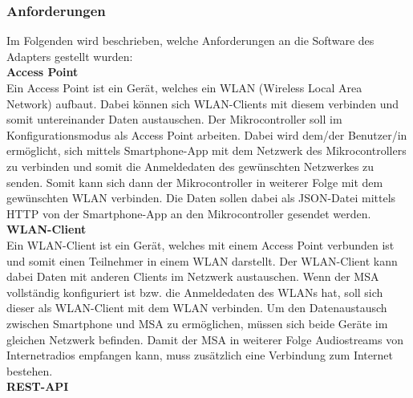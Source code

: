 \documentclass[11pt, twoside]{article}
\begin{document}
\subsubsection{Anforderungen}
Im Folgenden wird beschrieben, welche Anforderungen an die Software des Adapters gestellt wurden: \newline \\
\textbf{Access Point} \\
Ein Access Point ist ein Gerät, welches ein WLAN (Wireless Local Area Network) aufbaut. Dabei können sich WLAN-Clients mit diesem verbinden und somit untereinander Daten austauschen. \parencite[vgl.][]{noauthor_urlpi10_nodate-1}
Der Mikrocontroller soll im Konfigurationsmodus als Access Point arbeiten. Dabei wird dem/der Benutzer/in ermöglicht, sich mittels Smartphone-App mit dem Netzwerk des Mikrocontrollers zu verbinden und somit die Anmeldedaten des gewünschten Netzwerkes zu senden. Somit kann sich dann der Mikrocontroller in weiterer Folge mit dem gewünschten WLAN verbinden. Die Daten sollen dabei als JSON-Datei mittels HTTP von der Smartphone-App an den Mikrocontroller gesendet werden. \newline \\
\textbf{WLAN-Client} \\
Ein WLAN-Client ist ein Gerät, welches mit einem Access Point verbunden ist und somit einen Teilnehmer in einem WLAN darstellt. Der WLAN-Client kann dabei Daten mit anderen Clients im Netzwerk austauschen. Wenn der MSA vollständig konfiguriert ist bzw. die Anmeldedaten des WLANs hat, soll sich dieser als WLAN-Client mit dem WLAN verbinden. Um den Datenaustausch zwischen Smartphone und MSA zu ermöglichen, müssen sich beide Geräte im gleichen Netzwerk befinden. Damit der MSA in weiterer Folge Audiostreams von Internetradios empfangen kann, muss zusätzlich eine Verbindung zum Internet bestehen. \newline \\
\textbf{REST-API} \\
\end{document}
